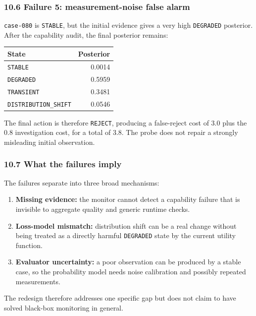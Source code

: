 \documentclass[
]{article}
\providecommand{\tightlist}{%
  \setlength{\itemsep}{0pt}\setlength{\parskip}{0pt}}
\begin{document}
\subsubsection{10.6 Failure 5: measurement-noise false
alarm}\label{failure-5-measurement-noise-false-alarm}

\texttt{case-080} is \texttt{STABLE}, but the initial evidence gives a
very high \texttt{DEGRADED} posterior. After the capability audit, the
final posterior remains:

\begin{longtable}[]{@{}lr@{}}
\toprule\noalign{}
State & Posterior \\
\midrule\noalign{}
\endhead
\bottomrule\noalign{}
\endlastfoot
\texttt{STABLE} & 0.0014 \\
\texttt{DEGRADED} & 0.5959 \\
\texttt{TRANSIENT} & 0.3481 \\
\texttt{DISTRIBUTION\_SHIFT} & 0.0546 \\
\end{longtable}

The final action is therefore \texttt{REJECT}, producing a false-reject
cost of 3.0 plus the 0.8 investigation cost, for a total of 3.8. The
probe does not repair a strongly misleading initial observation.

\subsubsection{10.7 What the failures
imply}\label{what-the-failures-imply}

The failures separate into three broad mechanisms:

\begin{enumerate}
\def\labelenumi{\arabic{enumi}.}
\tightlist
\item
  \textbf{Missing evidence:} the monitor cannot detect a capability
  failure that is invisible to aggregate quality and generic runtime
  checks.
\item
  \textbf{Loss-model mismatch:} distribution shift can be a real change
  without being treated as a directly harmful \texttt{DEGRADED} state by
  the current utility function.
\item
  \textbf{Evaluator uncertainty:} a poor observation can be produced by
  a stable case, so the probability model needs noise calibration and
  possibly repeated measurements.
\end{enumerate}

The redesign therefore addresses one specific gap but does not claim to
have solved black-box monitoring in general.
\end{document}
